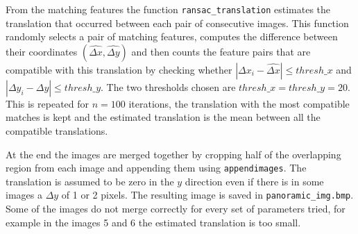 \documentclass[a4paper,oneside]{article}
\newcommand{\inlinecode}[1]{\lstinline[basicstyle=\ttfamily,keywordstyle={},stringstyle={},commentstyle={\itshape}]{#1}}
\newcommand{\abs}[1]{\left|#1\right|}
\begin{document}
From the matching features the function
\inlinecode{ransac_translation} estimates the translation that
occurred between each pair of consecutive images. This function
randomly selects a pair of matching features, computes the difference
between their coordinates $(\hat{\Delta x}, \hat{\Delta y})$ and then
counts the feature pairs that are compatible with this translation by
checking whether $\abs{\Delta x_i - \hat{\Delta x}} \leq
\mathit{thresh\_x}$ and $\abs{\Delta y_i - \hat{\Delta y}} \leq
\mathit{thresh\_y}$. The two thresholds chosen are $\mathit{thresh\_x}
= \mathit{thresh\_y} = 20$. This is repeated for $n=100$ iterations,
the translation with the most compatible matches is kept and the
estimated translation is the mean between all the compatible
translations.

At the end the images are merged together by cropping half of the
overlapping region from each image and appending them using
\inlinecode{appendimages}. The translation is assumed to be zero in
the $y$ direction even if there is in some images a $\Delta y$ of 1 or
2 pixels. The resulting image is saved in
\inlinecode{panoramic_img.bmp}. Some of the images do not merge
correctly for every set of parameters tried, for example in the images
5 and 6 the estimated translation is too small.
\end{document}
